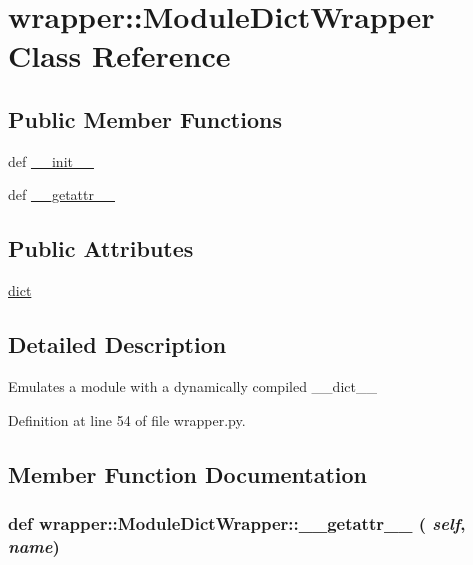\hypertarget{classwrapper_1_1ModuleDictWrapper}{
\section{wrapper::ModuleDictWrapper Class Reference}
\label{classwrapper_1_1ModuleDictWrapper}
}
\subsection*{Public Member Functions}
\begin{DoxyCompactItemize}
\item 
def \hyperlink{classwrapper_1_1ModuleDictWrapper_ab9c57cee66be3af210552d4e94f165c4}{\_\-\_\-init\_\-\_\-}
\item 
def \hyperlink{classwrapper_1_1ModuleDictWrapper_a4b164359452bb21d8f8dfc8c3e570c64}{\_\-\_\-getattr\_\-\_\-}
\end{DoxyCompactItemize}
\subsection*{Public Attributes}
\begin{DoxyCompactItemize}
\item 
\hyperlink{classwrapper_1_1ModuleDictWrapper_afc64f92e1307c8668944903e0691313e}{dict}
\end{DoxyCompactItemize}


\subsection{Detailed Description}
\begin{DoxyVerb}Emulates a module with a dynamically compiled __dict__\end{DoxyVerb}
 

Definition at line 54 of file wrapper.py.

\subsection{Member Function Documentation}
\hypertarget{classwrapper_1_1ModuleDictWrapper_a4b164359452bb21d8f8dfc8c3e570c64}{
\subsubsection[{\_\-\_\-getattr\_\-\_\-}]{\setlength{\rightskip}{0pt plus 5cm}def wrapper::ModuleDictWrapper::\_\-\_\-getattr\_\-\_\- ( {\em self}, \/   {\em name})}}
\label{classwrapper_1_1ModuleDictWrapper_a4b164359452bb21d8f8dfc8c3e570c64}


